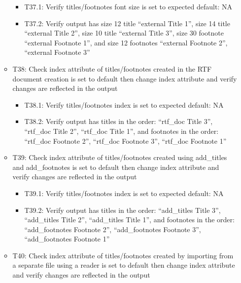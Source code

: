 \documentclass[]{article}
\providecommand{\tightlist}{%
  \setlength{\itemsep}{0pt}\setlength{\parskip}{0pt}}
\begin{document}
\begin{itemize}
\begin{itemize}
    \begin{itemize}
    \tightlist
    \item
      T37.1: Verify titles/footnotes font size is set to expected
      default: NA
    \item
      T37.2: Verify output has size 12 title ``external Title 1'', size
      14 title ``external Title 2'', size 10 title ``external Title 3'',
      size 30 footnote ``external Footnote 1'', and size 12 footnotes
      ``external Footnote 2'', ``external Footnote 3''
    \end{itemize}
  \item
    T38: Check index attribute of titles/footnotes created in the RTF
    document creation is set to default then change index attribute and
    verify changes are reflected in the output

    \begin{itemize}
    \tightlist
    \item
      T38.1: Verify titles/footnotes index is set to expected default:
      NA
    \item
      T38.2: Verify output has titles in the order: ``rtf\_doc Title
      3'', ``rtf\_doc Title 2'', ``rtf\_doc Title 1'', and footnotes in
      the order: ``rtf\_doc Footnote 2'', ``rtf\_doc Footnote 3'',
      ``rtf\_doc Footnote 1''
    \end{itemize}
  \item
    T39: Check index attribute of titles/footnotes created using
    add\_titles and add\_footnotes is set to default then change index
    attribute and verify changes are reflected in the output

    \begin{itemize}
    \tightlist
    \item
      T39.1: Verify titles/footnotes index is set to expected default:
      NA
    \item
      T39.2: Verify output has titles in the order: ``add\_titles Title
      3'', ``add\_titles Title 2'', ``add\_titles Title 1'', and
      footnotes in the order: ``add\_footnotes Footnote 2'',
      ``add\_footnotes Footnote 3'', ``add\_footnotes Footnote 1''
    \end{itemize}
  \item
    T40: Check index attribute of titles/footnotes created by importing
    from a separate file using a reader is set to default then change
    index attribute and verify changes are reflected in the output


\end{itemize}
\end{itemize}
\end{document}
